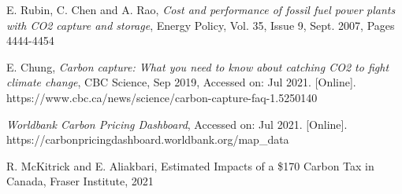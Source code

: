 \documentclass{article}
\begin{document}
\begin{thebibliography}{1}
 E. Rubin, C. Chen and A. Rao, \textit{Cost and performance of fossil fuel power plants with CO2 capture and storage}, Energy Policy, Vol. 35, Issue 9, Sept. 2007, Pages 4444-4454

 E. Chung, \textit{Carbon capture: What you need to know about catching CO2 to fight climate change}, CBC Science, Sep 2019, Accessed on: Jul 2021. [Online]. https://www.cbc.ca/news/science/carbon-capture-faq-1.5250140

 \textit{Worldbank Carbon Pricing Dashboard}, Accessed on: Jul 2021. [Online]. https://carbonpricingdashboard.worldbank.org/map\_data

 R. McKitrick and E. Aliakbari, Estimated Impacts of a \$170 Carbon Tax in Canada, Fraser Institute, 2021

\end{thebibliography}
\end{document}
